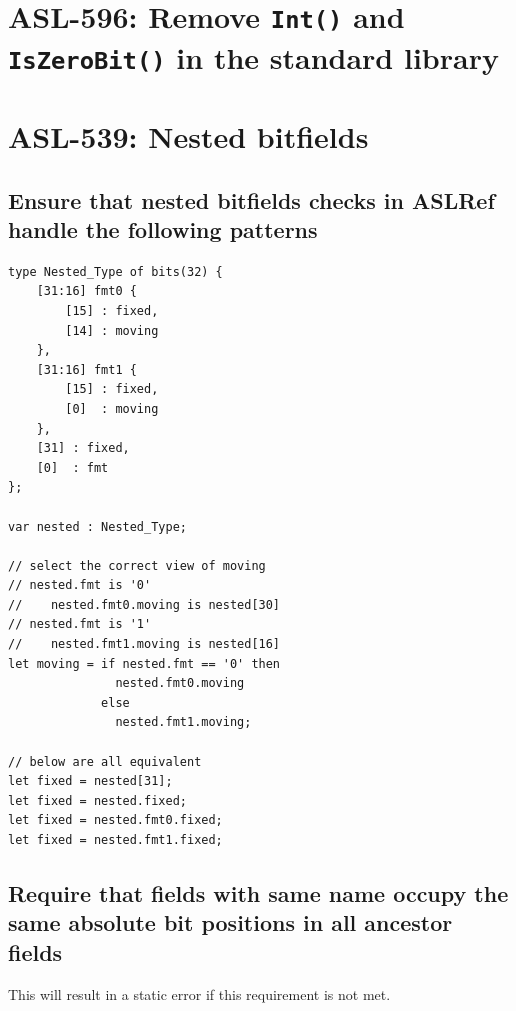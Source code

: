 \section{ASL-596: Remove \texttt{Int()} and \texttt{IsZeroBit()} in the standard library}

\section{ASL-539: Nested bitfields}

\subsection{Ensure that nested bitfields checks in ASLRef handle the following patterns}

\begin{verbatim}
type Nested_Type of bits(32) {
    [31:16] fmt0 {
        [15] : fixed,
        [14] : moving
    },
    [31:16] fmt1 {
        [15] : fixed,
        [0]  : moving
    },
    [31] : fixed,
    [0]  : fmt
};

var nested : Nested_Type;

// select the correct view of moving
// nested.fmt is '0'
//    nested.fmt0.moving is nested[30]
// nested.fmt is '1'
//    nested.fmt1.moving is nested[16]
let moving = if nested.fmt == '0' then
               nested.fmt0.moving
             else
               nested.fmt1.moving;

// below are all equivalent
let fixed = nested[31];
let fixed = nested.fixed;
let fixed = nested.fmt0.fixed;
let fixed = nested.fmt1.fixed;
\end{verbatim}

\subsection{Require that fields with same name occupy the same absolute bit
positions in all ancestor fields}

This will result in a static error if this requirement is not met.